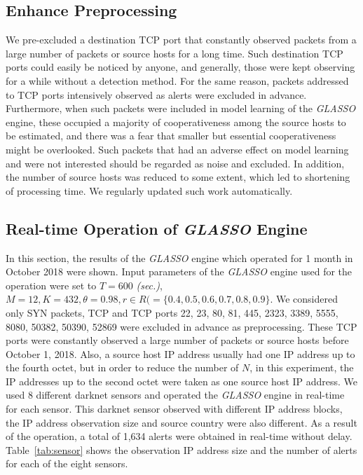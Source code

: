 \documentclass[conference]{IEEEtran}
\begin{document}
\subsection{Enhance Preprocessing}

We pre-excluded a destination TCP port that constantly observed packets from a large number of packets or source hosts for a long time.
Such destination TCP ports could easily be noticed by anyone, and generally, those were kept observing for a while without a detection method.
For the same reason, packets addressed to TCP ports intensively observed as alerts were excluded in advance.
Furthermore, when such packets were included in model learning of the {\it GLASSO} engine, these occupied a majority of cooperativeness among the source hosts to be estimated, and there was a fear that smaller but essential cooperativeness might be overlooked.
Such packets that had an adverse effect on model learning and were not interested should be regarded as noise and excluded.
In addition, the number of source hosts was reduced to some extent, which led to shortening of processing time.
We regularly updated such work automatically.



\subsection{Real-time Operation of {\it GLASSO} Engine}

In this section, the results of the {\it GLASSO} engine which operated for 1 month in October 2018 were shown.
Input parameters of the {\it GLASSO} engine used for the operation were set to $T=600$ {\it (sec.)}, $M=12, K=432, \theta=0.98, r \in R ( = \{0.4, 0.5, 0.6, 0.7, 0.8, 0.9\}$.
We considered only SYN packets, TCP and TCP ports 22, 23, 80, 81, 445, 2323, 3389, 5555, 8080, 50382, 50390, 52869 were excluded in advance as preprocessing.
These TCP ports were constantly observed a large number of packets or source hosts before October 1, 2018.
Also, a source host IP address usually had one IP address up to the fourth octet, but in order to reduce the number of $N$, in this experiment, the IP addresses up to the second octet were taken as one source host IP address.
We used 8 different darknet sensors and operated the {\it GLASSO} engine in real-time for each sensor.
This darknet sensor observed with different IP address blocks, the IP address observation size and source country were also different.
As a result of the operation, a total of 1,634 alerts were obtained in real-time without delay.
Table~\ref{tab:sensor} shows the observation IP address size and the number of alerts for each of the eight sensors.
\end{document}
